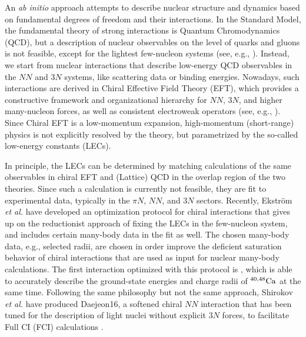 An \emph{ab initio} approach attempts to describe nuclear
structure and dynamics based on fundamental degrees of freedom and their
interactions. In the Standard Model, the fundamental theory of strong
interactions is Quantum Chromodynamics (QCD), but a description of nuclear 
observables on the level of quarks and gluons is not feasible, 
except for the lightest few-nucleon systems (see, e.g., \cite{Detmold:2015xw}).
Instead, we start from nuclear interactions that describe low-energy QCD observables in the $NN$ and $3N$
systems, like scattering data or binding energies. Nowadays, such interactions 
are derived in Chiral Effective Field Theory (EFT),
which provides a constructive framework and organizational hierarchy
for $NN$, $3N$, and higher many-nucleon forces, as well as consistent
electroweak operators (see, e.g., \cite{Epelbaum:2009ve,Machleidt:2011bh,Epelbaum:2015gf,Entem:2015qf,Gezerlis:2014zr,Lynn:2015eu,Pastore:2009zr,Pastore:2011dq,Piarulli:2013vn,Kolling:2009yq,Kolling:2011bh}).
Since Chiral EFT is a low-momentum expansion, high-momentum (short-range)
physics is not explicitly resolved by the theory, but parametrized
by the so-called low-energy constants (LECs). 

In principle, the LECs can be determined by matching calculations of
the same observables in chiral EFT and (Lattice) QCD in the overlap
region of the two theories. Since such a calculation is currently not 
feasible, they are
fit to experimental data, typically in the $\pi{}N$, $NN$, and $3N$ sectors. 
Recently, Ekstr\"om \emph{et al.} have developed an optimization protocol
for chiral interactions that gives up on the reductionist approach of
fixing the LECs in the few-nucleon system, and includes certain many-body
data in the fit as well. The chosen many-body data, e.g., selected radii, are 
chosen in order improve the deficient saturation behavior of chiral interactions 
that are used as input for nuclear many-body calculations. The first interaction
optimized with this protocol is \NNLOsat{} \cite{Ekstrom:2015fk}, which is
able to accurately describe the ground-state energies and charge radii of 
$\nuc{Ca}{40,48}$ at the same time. Following 
the same philosophy but not the same approach, Shirokov \emph{et al.} have 
produced Daejeon16, a softened chiral $NN$ interaction that has been tuned 
for the description of light nuclei without explicit $3N$ forces, to facilitate
Full CI (FCI) calculations \cite{Shirokov:2004fe,Shirokov:2005bv,Shirokov:2007by,Shirokov:2016wo}.

